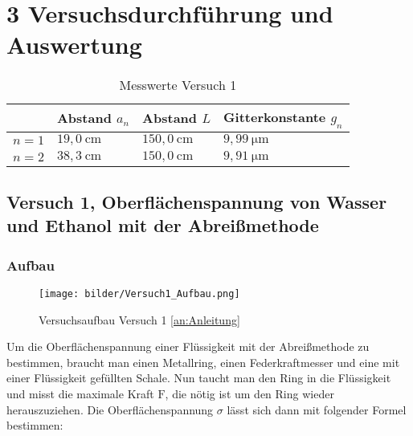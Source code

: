 \chapter*{3 Versuchsdurchführung und Auswertung}
\setcounter{chapter}{3}
\setcounter{section}{0}
\setcounter{subsection}{0}

        \begin{table}[H]
            \centering
            \caption{Messwerte Versuch 1}
            \vspace*{1em}
            \begin{tabular}{|l|l|l|l|}
                \hline
                & Abstand $a_{n}$ & Abstand $L$ & Gitterkonstante $g_{n}$\\
                \hline
                $n = 1$ & $19,0\ \mathrm{cm}$ & $150,0\ \mathrm{cm}$ & $9,99\ \mathrm{\mu m}$\\
                \hline
                $n = 2$ & $38,3\ \mathrm{cm}$ & $150,0\ \mathrm{cm}$ & $9,91\ \mathrm{\mu m}$\\
                \hline
            \end{tabular}
        \end{table}
 
        \section{Versuch 1, Oberflächenspannung von Wasser und Ethanol mit der Abreißmethode}
        \label{sec:Versuch1}

        \subsection{Aufbau}

        \begin{figure}[H]
            \centering
            \texttt{[image: bilder/Versuch1\_Aufbau.png]}
            \caption{Versuchsaufbau Versuch 1 \ref{an:Anleitung}}
            \label{fig:Versuch1_Aufbau}
        \end{figure}

        Um die Oberflächenspannung einer Flüssigkeit mit der Abreißmethode zu bestimmen,
        braucht man einen Metallring, einen Federkraftmesser und eine mit einer Flüssigkeit gefüllten Schale. Nun taucht man den Ring in die Flüssigkeit und misst die maximale Kraft $\mathrm{F}$, die nötig ist um den Ring wieder herauszuziehen. Die Oberflächenspannung $\sigma$ lässt sich dann mit folgender Formel bestimmen:


